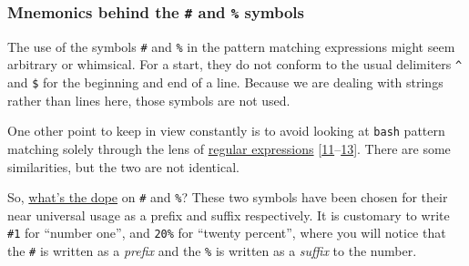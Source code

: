 \documentclass[
  a4paper,
]{article}
\newenvironment{Shaded}{\begin{snugshade}}{\end{snugshade}}
\newcommand{\BuiltInTok}[1]{\textcolor[rgb]{0.80,0.80,0.80}{#1}}
\newcommand{\CommentTok}[1]{\textcolor[rgb]{0.50,0.62,0.50}{#1}}
\newcommand{\NormalTok}[1]{\textcolor[rgb]{0.80,0.80,0.80}{#1}}
\newcommand{\OperatorTok}[1]{\textcolor[rgb]{0.94,0.94,0.82}{#1}}
\newcommand{\PreprocessorTok}[1]{\textcolor[rgb]{1.00,0.81,0.69}{\textbf{#1}}}
\newcommand{\StringTok}[1]{\textcolor[rgb]{0.80,0.58,0.58}{#1}}
\newcommand{\VariableTok}[1]{\textcolor[rgb]{0.80,0.80,0.80}{#1}}
\begin{document}
\begin{Shaded}
\end{Shaded}

\hypertarget{mnemonics-behind-the-and-symbols}{%
\subsubsection{\texorpdfstring{Mnemonics behind the \texttt{\#} and
\texttt{\%}
symbols}{Mnemonics behind the \# and \% symbols}}\label{mnemonics-behind-the-and-symbols}}

The use of the symbols \texttt{\#} and \texttt{\%} in the pattern
matching expressions might seem arbitrary or whimsical. For a start,
they do not conform to the usual delimiters \texttt{\^{}} and
\texttt{\$} for the beginning and end of a line. Because we are dealing
with strings rather than lines here, those symbols are not used.

One other point to keep in view constantly is to avoid looking at
\texttt{bash} pattern matching solely through the lens of
\href{https://www.regular-expressions.info/tutorial.html}{regular
expressions}
{[}\protect\hyperlink{ref-posixcharclass}{11}--\protect\hyperlink{ref-writeregexp}{13}{]}.
There are some similarities, but the two are not identical.

So,
\href{https://www.ldoceonline.com/dictionary/the-dope-on-somebody-something}{what's
the dope} on \texttt{\#} and \texttt{\%}? These two symbols have been
chosen for their near universal usage as a prefix and suffix
respectively. It is customary to write \texttt{\#1} for ``number one'',
and \texttt{20\%} for ``twenty percent'', where you will notice that the
\texttt{\#} is written as a \emph{prefix} and the \texttt{\%} is written
as a \emph{suffix} to the number.
\end{document}
